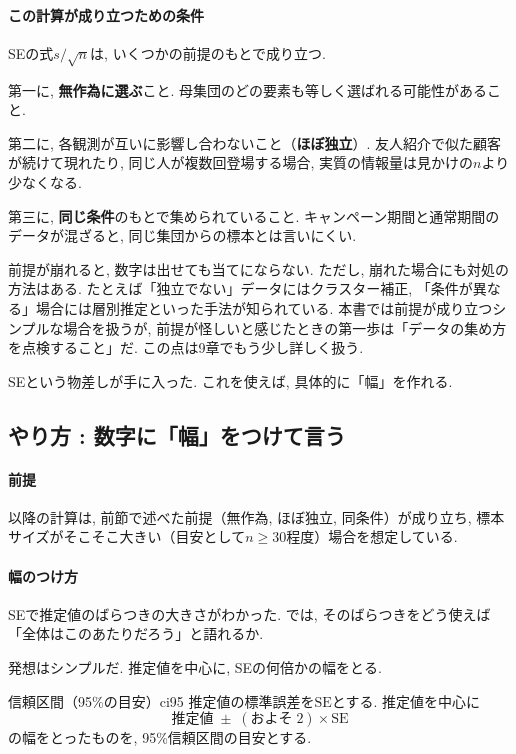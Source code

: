     \paragraph{この計算が成り立つための条件}

    SEの式$s/\sqrt{n}$は, いくつかの前提のもとで成り立つ.

    第一に, \textbf{無作為に選ぶ}こと.
    母集団のどの要素も等しく選ばれる可能性があること.

    第二に, 各観測が互いに影響し合わないこと（\textbf{ほぼ独立}）.
    友人紹介で似た顧客が続けて現れたり, 同じ人が複数回登場する場合, 実質の情報量は見かけの$n$より少なくなる.

    第三に, \textbf{同じ条件}のもとで集められていること.
    キャンペーン期間と通常期間のデータが混ざると, 同じ集団からの標本とは言いにくい.

    前提が崩れると, 数字は出せても当てにならない.
    ただし, 崩れた場合にも対処の方法はある.
    たとえば「独立でない」データにはクラスター補正, 「条件が異なる」場合には層別推定といった手法が知られている.
    本書では前提が成り立つシンプルな場合を扱うが, 前提が怪しいと感じたときの第一歩は「データの集め方を点検すること」だ.
    この点は9章でもう少し詳しく扱う.

    SEという物差しが手に入った.
    これを使えば, 具体的に「幅」を作れる.


  \subsection{やり方 : 数字に「幅」をつけて言う}

    \paragraph{前提}
    以降の計算は, 前節で述べた前提（無作為, ほぼ独立, 同条件）が成り立ち,
    標本サイズがそこそこ大きい（目安として$n \geq 30$程度）場合を想定している.

    \paragraph{幅のつけ方}

    SEで推定値のばらつきの大きさがわかった.
    では, そのばらつきをどう使えば「全体はこのあたりだろう」と語れるか.

    発想はシンプルだ.
    推定値を中心に, SEの何倍かの幅をとる.

    \begin{defi}{信頼区間（95\%の目安）}{ci95}
    推定値の標準誤差を$\mathrm{SE}$とする. 推定値を中心に
    \[
      \text{推定値} \;\pm\; (\text{およそ}\;2) \times \mathrm{SE}
    \]
    の幅をとったものを, 95\%信頼区間の目安とする.
    \end{defi}

